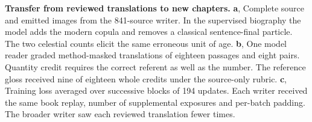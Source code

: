 \textbf{Transfer from reviewed translations to new chapters.} \textbf{a}, Complete source and emitted images from the 841-source writer. In the supervised biography the model adds the modern copula and removes a classical sentence-final particle. The two celestial counts elicit the same erroneous unit of age. \textbf{b}, One model reader graded method-masked translations of eighteen passages and eight pairs. Quantity credit requires the correct referent as well as the number. The reference gloss received nine of eighteen whole credits under the source-only rubric. \textbf{c}, Training loss averaged over successive blocks of 194 updates. Each writer received the same book replay, number of supplemental exposures and per-batch padding. The broader writer saw each reviewed translation fewer times.
